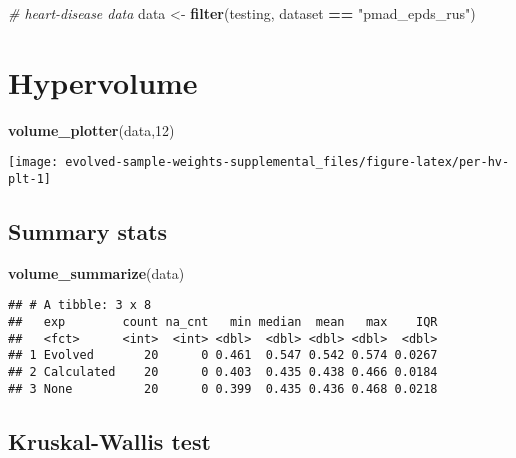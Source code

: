 \documentclass[
]{book}
\newenvironment{Shaded}{\begin{snugshade}}{\end{snugshade}}
\newcommand{\CommentTok}[1]{\textcolor[rgb]{0.56,0.35,0.01}{\textit{#1}}}
\newcommand{\DecValTok}[1]{\textcolor[rgb]{0.00,0.00,0.81}{#1}}
\newcommand{\FunctionTok}[1]{\textcolor[rgb]{0.13,0.29,0.53}{\textbf{#1}}}
\newcommand{\NormalTok}[1]{#1}
\newcommand{\OtherTok}[1]{\textcolor[rgb]{0.56,0.35,0.01}{#1}}
\newcommand{\SpecialCharTok}[1]{\textcolor[rgb]{0.81,0.36,0.00}{\textbf{#1}}}
\newcommand{\StringTok}[1]{\textcolor[rgb]{0.31,0.60,0.02}{#1}}
\begin{document}
\begin{Shaded}
\begin{Highlighting}[]
\CommentTok{\# heart{-}disease data}
\NormalTok{data }\OtherTok{\textless{}{-}} \FunctionTok{filter}\NormalTok{(testing, dataset }\SpecialCharTok{==} \StringTok{"pmad\_epds\_rus"}\NormalTok{)}
\end{Highlighting}
\end{Shaded}

\hypertarget{hypervolume-11}{%
\section{Hypervolume}\label{hypervolume-11}}

\begin{Shaded}
\begin{Highlighting}[]
\FunctionTok{volume\_plotter}\NormalTok{(data,}\DecValTok{12}\NormalTok{)}
\end{Highlighting}
\end{Shaded}

\texttt{[image: evolved-sample-weights-supplemental\_files/figure-latex/per-hv-plt-1]}

\hypertarget{summary-stats-11}{%
\subsection{Summary stats}\label{summary-stats-11}}

\begin{Shaded}
\begin{Highlighting}[]
\FunctionTok{volume\_summarize}\NormalTok{(data)}
\end{Highlighting}
\end{Shaded}

\begin{verbatim}
## # A tibble: 3 x 8
##   exp        count na_cnt   min median  mean   max    IQR
##   <fct>      <int>  <int> <dbl>  <dbl> <dbl> <dbl>  <dbl>
## 1 Evolved       20      0 0.461  0.547 0.542 0.574 0.0267
## 2 Calculated    20      0 0.403  0.435 0.438 0.466 0.0184
## 3 None          20      0 0.399  0.435 0.436 0.468 0.0218
\end{verbatim}

\hypertarget{kruskal-wallis-test-11}{%
\subsection{Kruskal-Wallis test}\label{kruskal-wallis-test-11}}
\end{document}
